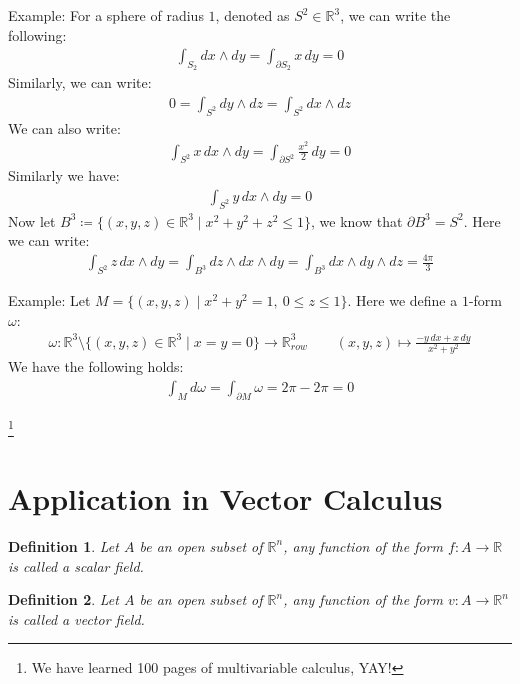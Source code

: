 \documentclass[11pt,oneside]{book}
\theoremstyle{break}
\theoremstyle{break}
\newtheorem{defn}{Definition}[corL]
\newcommand{\R}{\mathbb{R}}
\newcommand{\pd}{\partial}
\newcommand{\example}{\color{green}Example: \color{black}}
\newcommand\blfootnote[1]{%
  \begingroup
  \renewcommand\thefootnote{}\footnote{#1}%
  \addtocounter{footnote}{-1}%
  \endgroup
}
\begin{document}
\example 
For a sphere of radius $1$, denoted as $S^2 \in \R^3$, we can write the following:
\begin{align*}
 \int_{S_2} dx \wedge dy = \int_{\pd S_2}x \, dy = 0
\end{align*}
Similarly, we can write:
\begin{align*}
0 = \int_{S^2} dy \wedge dz = \int_{S^2} dx \wedge dz
\end{align*}
We can also write:
\begin{align*}
\int_{S^2} x\, dx \wedge dy = \int_{\pd S^2} \frac{x^2}{2}\, dy = 0
\end{align*}
Similarly we have:
\begin{align*}
 \int_{S^2} y \, dx \wedge dy = 0
\end{align*}
Now let $B^3 \coloneqq \{ (x,y,z) \in \R^3 \mid x^2 + y^2 + z^2 \leq 1\}$, we know that $\pd B^3 = S^2$. Here we can write:
\begin{align*}
\int_{S^2} z \, dx \wedge dy = \int_{B^3} dz \wedge dx \wedge dy = \int_{B^3} dx \wedge dy \wedge dz = \frac{4\pi }{3}
\end{align*}
\hfill\break\hfill\break

\example Let $M = \{ (x,y,z) \mid x^2 + y^2 =1 , \ 0 \leq z \leq 1\}$. Here we define a $1$-form $\omega$:
\begin{align*}
\omega:\R^3\setminus\{(x,y,z) \in \R^3 \mid x=y=0\} \to \R^3_{row} \qquad (x,y,z)\mapsto \frac{-y\, dx + x \, dy}{x^2 + y^2}
\end{align*}
We have the following holds:
\begin{align*}
 \int_{M} d\omega = \int_{\pd M} \omega = 2\pi -2 \pi =  0
\end{align*}

\blfootnote{We have learned 100 pages of multivariable calculus, YAY!}



\newpage
\section[Application in Vector Calculus]{\color{red}Application in Vector Calculus\color{black}}

\begin{defn}
Let $A$ be an open subset of $\R^n$, any function of the form $f: A \to \R$ is called a scalar field.
\end{defn}

\begin{defn}
Let $A $ be an open subset of $\R^n$, any function of the form $v :A \to \R^n$ is called a vector field.
\end{defn}
\end{document}
